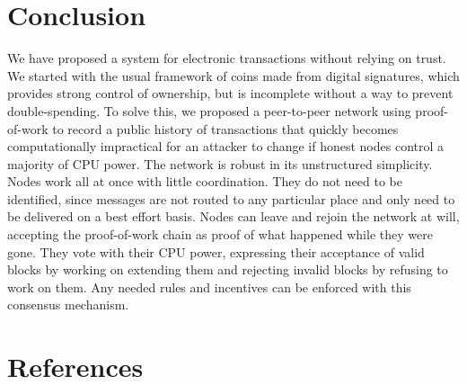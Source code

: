 \documentclass[11pt]{article}
\begin{document}
\section{Conclusion}
\label{sec:orge19d218}
We have proposed a system for electronic transactions without relying on trust.
We started with the usual framework of coins made from digital signatures, which provides strong control of ownership, but is incomplete without a way to prevent double-spending.
To solve this, we proposed a peer-to-peer network using proof-of-work to record a public history of transactions that quickly becomes computationally impractical for an attacker to change if honest nodes control a majority of CPU power.
The network is robust in its unstructured simplicity.
Nodes work all at once with little coordination.
They do not need to be identified, since messages are not routed to any particular place and only need to be delivered on a best effort basis.
Nodes can leave and rejoin the network at will, accepting the proof-of-work chain as proof of what happened while they were gone.
They vote with their CPU power, expressing their acceptance of valid blocks by working on extending them and rejecting invalid blocks by refusing to work on them.
Any needed rules and incentives can be enforced with this consensus mechanism.

\section{References}
\label{sec:org5db898a}
\end{document}
